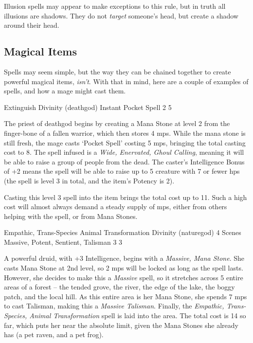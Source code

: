 \begin{multicols}{2}
Illusion spells may appear to make exceptions to this rule, but in truth all illusions are shadows.
They do not \emph{target} someone's head, but create a shadow around their head.

\subsection{Magical Items}

\noindent
Spells may seem simple, but the way they can be chained together to create powerful magical items, \emph{isn't}.
With that in mind, here are a couple of examples of spells, and how a mage might cast them.

  {Extinguish}%
  {Divinity (\gls{deathgod})}%
  {Instant}%
  {Pocket Spell}%
  {2}%
  {5}%

The priest of \gls{deathgod} begins by creating a Mana Stone at level 2 from the finger-bone of a fallen warrior, which then stores 4 \glspl{mp}.
While the mana stone is still fresh, the mage casts `Pocket Spell' costing 5 \glspl{mp}, bringing the total casting cost to 8.
The spell infused is a \textit{Wide, Enervated, Ghoul Calling}, meaning it will be able to raise a group of people from the dead.
The caster's Intelligence Bonus of +2 means the spell will be able to raise up to 5 creature with 7 or fewer \glspl{hp} (the spell is level 3 in total, and the item's Potency is 2).

Casting this level 3 spell into the item brings the total cost up to 11.
Such a high cost will almost always demand a steady supply of \glspl{mp}, either from others helping with the spell, or from Mana Stones.


  {Empathic, Trans-Species Animal Transformation}%
  {Divinity (\gls{naturegod})}%
  {4 Scenes}%
  {Massive, Potent, Sentient, Talisman}%
  {3}%
  {3}%

A powerful druid, with +3 Intelligence, begins with a \textit{Massive, Mana Stone}.
She casts Mana Stone at 2nd level, so 2 \glspl{mp} will be locked as long as the spell lasts.
However, she decides to make this a \textit{Massive} spell, so it stretches across 5 entire areas of a forest -- the tended grove, the river, the edge of the lake, the boggy patch, and the local hill.
As this entire area is her Mana Stone, she spends 7 \glspl{mp} to cast Talisman, making this a \textit{Massive Talisman}.
Finally, the \textit{Empathic, Trans-Species, Animal Transformation} spell is laid into the area.
The total cost is 14 so far, which puts her near the absolute limit, given the Mana Stones she already has (a pet raven, and a pet frog).


\end{multicols}
